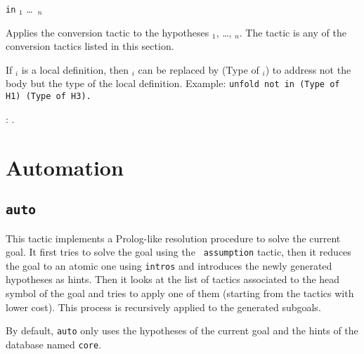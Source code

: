 \begin{coq_example*}
{\convtactic} {\tt in} \ident$_1$ \dots\ \ident$_n$

Applies the conversion tactic {\convtactic} to the
hypotheses \ident$_1$, \ldots, \ident$_n$. The tactic {\convtactic} is
any of the conversion tactics listed in this section.

If \ident$_i$ is a local definition, then \ident$_i$ can be replaced
by (Type of \ident$_i$) to address not the body but the type of the
local definition. Example: {\tt unfold not in (Type of H1) (Type of H3).}

\begin{ErrMsgs}
\item {} : {\ident}.
\end{ErrMsgs}


\section{Automation}
\subsection{\tt auto}
\label{auto}

This tactic implements a Prolog-like resolution procedure to solve the
current goal. It first tries to solve the goal using the {\tt
  assumption} tactic, then it reduces the goal to an atomic one using
{\tt intros} and introduces the newly generated hypotheses as hints.
Then it looks at the list of tactics associated to the head symbol of
the goal and tries to apply one of them (starting from the tactics
with lower cost). This process is recursively applied to the generated
subgoals.

By default, \texttt{auto} only uses the hypotheses of the current goal and the
hints of the database named {\tt core}.

\end{coq_example*}
